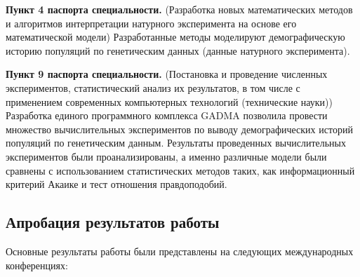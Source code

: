 \documentclass[a4paper,14pt,oneside,openany,article]{memoir}
\begin{document}

\textbf{Пункт 4  паспорта специальности.} (Разработка новых математических методов и алгоритмов интерпретации натурного эксперимента на основе его математической модели)
Разработанные методы моделируют демографическую историю популяций по генетическим данных (данные натурного эксперимента).



\textbf{Пункт 9  паспорта специальности.} (Постановка и проведение численных экспериментов, статистический анализ их результатов, в том числе с применением современных компьютерных технологий (технические науки))
Разработка единого программного комплекса GADMA позволила провести множество вычислительных экспериментов по выводу демографических историй популяций по генетическим данным.
Результаты проведенных вычислительных экспериментов были проанализированы, а именно различные модели были сравнены с использованием статистических методов таких, как информационный критерий Акаике и тест отношения правдоподобий.


\subsection*{Апробация результатов работы}

Основные результаты работы были представлены на следующих международных конференциях:
\end{document}
